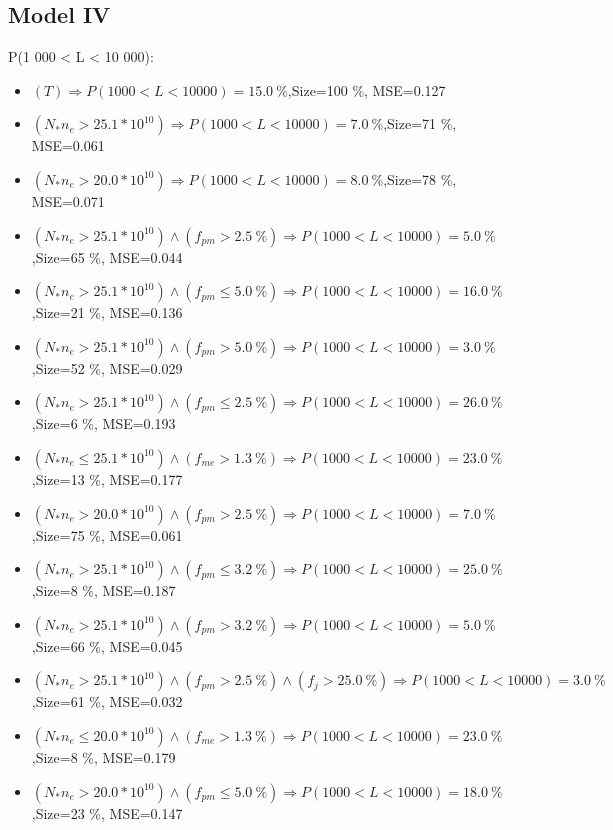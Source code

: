 \documentclass[numbered]{CSL}
\begin{document}
\subsection{Model IV}
P(1 000 < L < 10 000):
\begin{itemize}
\item $(T) \Rightarrow P(1 000 < L < 10 000) = 15.0~\%$,\hfill Size=100 \%, MSE=0.127
\item $(N_* n_e > 25.1 * 10^{10}) \Rightarrow P(1 000 < L < 10 000) = 7.0~\%$,\hfill Size=71 \%, MSE=0.061
\item $(N_* n_e > 20.0 * 10^{10}) \Rightarrow P(1 000 < L < 10 000) = 8.0~\%$,\hfill Size=78 \%, MSE=0.071
\item $(N_* n_e > 25.1 * 10^{10}) \land (f_{pm} > 2.5~\%) \Rightarrow P(1 000 < L < 10 000) = 5.0~\%$,\hfill Size=65 \%, MSE=0.044
\item $(N_* n_e > 25.1 * 10^{10}) \land (f_{pm} \leq 5.0~\%) \Rightarrow P(1 000 < L < 10 000) = 16.0~\%$,\hfill Size=21 \%, MSE=0.136
\item $(N_* n_e > 25.1 * 10^{10}) \land (f_{pm} > 5.0~\%) \Rightarrow P(1 000 < L < 10 000) = 3.0~\%$,\hfill Size=52 \%, MSE=0.029
\item $(N_* n_e > 25.1 * 10^{10}) \land (f_{pm} \leq 2.5~\%) \Rightarrow P(1 000 < L < 10 000) = 26.0~\%$,\hfill Size=6 \%, MSE=0.193
\item $(N_* n_e \leq 25.1 * 10^{10}) \land (f_{me} > 1.3~\%) \Rightarrow P(1 000 < L < 10 000) = 23.0~\%$,\hfill Size=13 \%, MSE=0.177
\item $(N_* n_e > 20.0 * 10^{10}) \land (f_{pm} > 2.5~\%) \Rightarrow P(1 000 < L < 10 000) = 7.0~\%$,\hfill Size=75 \%, MSE=0.061
\item $(N_* n_e > 25.1 * 10^{10}) \land (f_{pm} \leq 3.2~\%) \Rightarrow P(1 000 < L < 10 000) = 25.0~\%$,\hfill Size=8 \%, MSE=0.187
\item $(N_* n_e > 25.1 * 10^{10}) \land (f_{pm} > 3.2~\%) \Rightarrow P(1 000 < L < 10 000) = 5.0~\%$,\hfill Size=66 \%, MSE=0.045
\item $(N_* n_e > 25.1 * 10^{10}) \land (f_{pm} > 2.5~\%) \land (f_j > 25.0~\%) \Rightarrow P(1 000 < L < 10 000) = 3.0~\%$,\hfill Size=61 \%, MSE=0.032
\item $(N_* n_e \leq 20.0 * 10^{10}) \land (f_{me} > 1.3~\%) \Rightarrow P(1 000 < L < 10 000) = 23.0~\%$,\hfill Size=8 \%, MSE=0.179
\item $(N_* n_e > 20.0 * 10^{10}) \land (f_{pm} \leq 5.0~\%) \Rightarrow P(1 000 < L < 10 000) = 18.0~\%$,\hfill Size=23 \%, MSE=0.147

\end{itemize}
\end{document}
